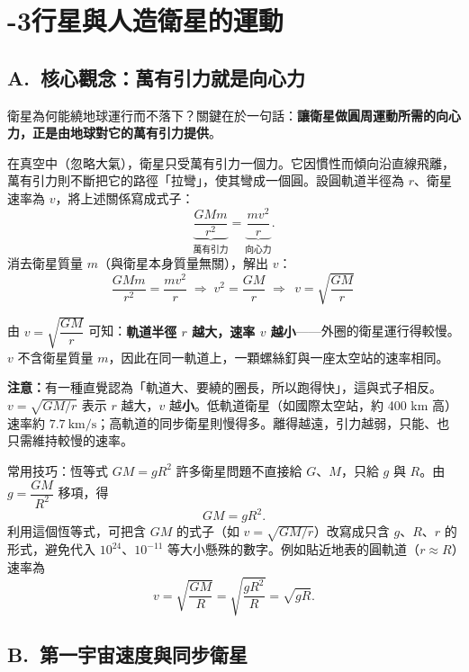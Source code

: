 \documentclass[11pt]{article}
\begin{document}
\section*{-3\quad 行星與人造衛星的運動}

\subsection*{\sffamily A.\ 核心觀念：萬有引力就是向心力}

衛星為何能繞地球運行而不落下？關鍵在於一句話：\textbf{讓衛星做圓周運動所需的向心力，正是由地球對它的萬有引力提供}。

在真空中（忽略大氣），衛星只受萬有引力一個力。它因慣性而傾向沿直線飛離，萬有引力則不斷把它的路徑「拉彎」，使其彎成一個圓。設圓軌道半徑為 $r$、衛星速率為 $v$，將上述關係寫成式子：
$$\underbrace{\dfrac{GMm}{r^{2}}}_{\text{萬有引力}}=\underbrace{\dfrac{mv^{2}}{r}}_{\text{向心力}}.$$
消去衛星質量 $m$（與衛星本身質量無關），解出 $v$：
$$\dfrac{GMm}{r^{2}}=\dfrac{mv^{2}}{r}\;\Longrightarrow\;v^{2}=\dfrac{GM}{r}\;\Longrightarrow\;\boxed{\,v=\sqrt{\dfrac{GM}{r}}\,}$$


由 $v=\sqrt{\dfrac{GM}{r}}$ 可知：\textbf{軌道半徑 $r$ 越大，速率 $v$ 越小}——外圈的衛星運行得較慢。$v$ 不含衛星質量 $m$，因此在同一軌道上，一顆螺絲釘與一座太空站的速率相同。

\textbf{注意：}有一種直覺認為「軌道大、要繞的圈長，所以跑得快」，這與式子相反。$v=\sqrt{GM/r}$ 表示 $r$ 越大，$v$ 越\textbf{小}。低軌道衛星（如國際太空站，約 400 km 高）速率約 $7.7\ \text{km/s}$；高軌道的同步衛星則慢得多。離得越遠，引力越弱，只能、也只需維持較慢的速率。

\begin{補充框}{常用技巧：恆等式 $GM=gR^2$}
許多衛星問題不直接給 $G$、$M$，只給 $g$ 與 $R$。由 $g=\dfrac{GM}{R^2}$ 移項，得
$$GM=gR^2.$$
利用這個恆等式，可把含 $GM$ 的式子（如 $v=\sqrt{GM/r}$）改寫成只含 $g$、$R$、$r$ 的形式，避免代入 $10^{24}$、$10^{-11}$ 等大小懸殊的數字。例如貼近地表的圓軌道（$r\approx R$）速率為
$$v=\sqrt{\dfrac{GM}{R}}=\sqrt{\dfrac{gR^2}{R}}=\sqrt{gR}.$$
\end{補充框}

\subsection*{\sffamily B.\ 第一宇宙速度與同步衛星}
\end{document}
